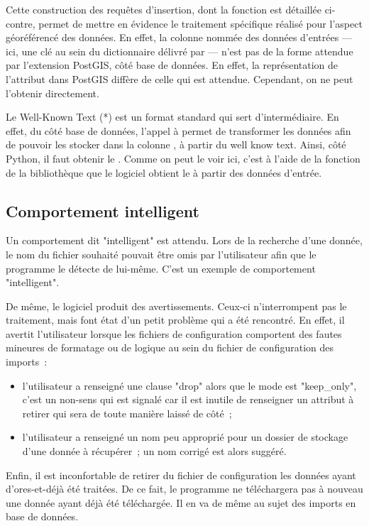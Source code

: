 Cette construction des requêtes d'insertion, dont la fonction est détaillée ci-contre, permet de mettre en évidence le traitement spécifique réalisé pour l'aspect géoréférencé des données. En effet, la colonne nommée  des données d'entrées --- ici, une clé au sein du dictionnaire délivré par  --- n'est pas de la forme attendue par l'extension PostGIS, côté base de données. En effet, la représentation de l'attribut  dans PostGIS diffère de celle qui est attendue. Cependant, on ne peut l'obtenir directement.

Le Well-Known Text (*) est un format standard qui sert d'intermédiaire. En effet, du côté base de données, l'appel à  permet de transformer les données afin de pouvoir les stocker dans la colonne , à partir du well know text. Ainsi, côté Python, il faut obtenir le . Comme on peut le voir ici, c'est à l'aide de la fonction  de la bibliothèque  que le logiciel obtient le  à partir des données d'entrée.

  \subsection{Comportement intelligent}

Un comportement dit "intelligent" est attendu. Lors de la recherche d'une donnée, le nom du fichier souhaité pouvait être omis par l'utilisateur afin que le programme le détecte de lui-même. C'est un exemple de comportement "intelligent".

De même, le logiciel produit des avertissements. Ceux-ci n'interrompent pas le traitement, mais font état d'un petit problème qui a été rencontré. En effet, il avertit l'utilisateur lorsque les fichiers de configuration comportent des fautes mineures de formatage ou de logique au sein du fichier de configuration des imports~:

\begin{itemize}
  \item l'utilisateur a renseigné une clause "drop" alors que le mode est "keep\_only", c'est un non-sens qui est signalé car il est inutile de renseigner un attribut à retirer qui sera de toute manière laissé de côté~;
  \item l'utilisateur a renseigné un nom peu approprié pour un dossier de stockage d'une donnée à récupérer~; un nom corrigé est alors suggéré.
\end{itemize}

Enfin, il est inconfortable de retirer du fichier de configuration les données ayant d'ores-et-déjà été traitées. De ce fait, le programme ne téléchargera pas à nouveau une donnée ayant déjà été téléchargée. Il en va de même au sujet des imports en base de données.
